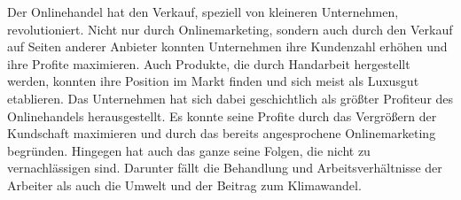 Der Onlinehandel hat den Verkauf, speziell von kleineren Unternehmen, revolutioniert. Nicht nur durch Onlinemarketing, sondern auch durch den Verkauf auf Seiten anderer Anbieter konnten Unternehmen ihre Kundenzahl erhöhen und ihre Profite maximieren. Auch Produkte, die durch Handarbeit hergestellt werden, konnten ihre Position im Markt finden und sich meist als Luxusgut etablieren. Das Unternehmen hat sich dabei geschichtlich als größter Profiteur des Onlinehandels herausgestellt. Es konnte seine Profite durch das Vergrößern der Kundschaft maximieren und durch das bereits angesprochene Onlinemarketing begründen. Hingegen hat auch das ganze seine Folgen, die nicht zu vernachlässigen sind. Darunter fällt die Behandlung und Arbeitsverhältnisse der Arbeiter als auch die Umwelt und der Beitrag zum Klimawandel. 